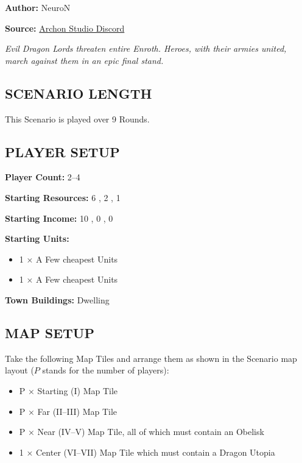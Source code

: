
\begin{multicols}{2}

\textbf{Author:} NeuroN

\textbf{Source:} \href{https://discord.com/channels/740870068178649108/1332731339614453802/1332731339614453802}{Archon Studio Discord}

\textit{Evil Dragon Lords threaten entire Enroth. Heroes, with their armies united, march against them in an epic final stand.}

\subsection*{\MakeUppercase{Scenario Length}}

This Scenario is played over 9 Rounds.

\subsection*{\MakeUppercase{Player Setup}}

\textbf{Player Count:} 2--4

\textbf{Starting Resources:} 6 , 2 , 1 

\textbf{Starting Income:} 10 , 0 , 0 

\textbf{Starting Units:}
\begin{itemize}
  \item  1 × A Few cheapest  Units
  \item  1 × A Few cheapest  Units
\end{itemize}

\textbf{Town Buildings:}  Dwelling

\subsection*{\MakeUppercase{Map Setup}}

Take the following Map Tiles and arrange them as shown in the Scenario map layout ($P$ stands for the number of players):

\begin{itemize}
  \item P × Starting (I) Map Tile
  \item P × Far (II--III) Map Tile
  \item P × Near (IV--V) Map Tile, all of which must contain an Obelisk
  \item 1 × Center (VI--VII) Map Tile which must contain a Dragon Utopia
\end{itemize}


\end{multicols}
